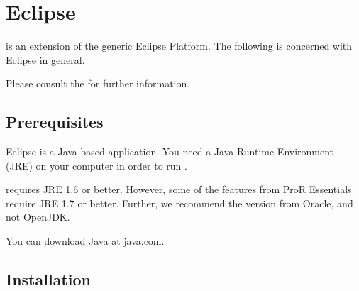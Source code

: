 % 

\section{Eclipse}
\label{sec:eclipse}

\pror{} is an extension of the generic Eclipse Platform.  The following is concerned with Eclipse in general.

\begin{info}
Please consult the 
 for further information.
\end{info}

\subsection{Prerequisites}

Eclipse is a Java-based application.  You need a Java Runtime Environment (JRE) on your computer in order to run \pror{}.

\pror{} requires JRE 1.6 or better.  However, some of the features from ProR Essentials require JRE 1.7 or better.  Further, we recommend the version from Oracle, and not OpenJDK.

\begin{info}
You can download Java at \href{https://www.java.com}{java.com}.
\end{info}

\subsection{Installation}
\label{sec:installation}

